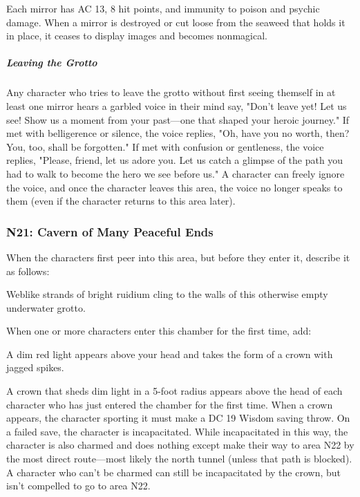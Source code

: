 \documentclass[10pt,a4paper,twoside,bg=print,twocolumn,openany,nodeprecatedcode]{dndbook}
\begin{document}
Each mirror has AC 13, 8 hit points, and immunity to poison and psychic damage. When a mirror is destroyed or cut loose from the seaweed that holds it in place, it ceases to display images and becomes nonmagical.

\subparagraph{Leaving the Grotto}
Any character who tries to leave the grotto without first seeing themself in at least one mirror hears a garbled voice in their mind say, "Don't leave yet! Let us see! Show us a moment from your past—one that shaped your heroic journey." If met with belligerence or silence, the voice replies, "Oh, have you no worth, then? You, too, shall be forgotten." If met with confusion or gentleness, the voice replies, "Please, friend, let us adore you. Let us catch a glimpse of the path you had to walk to become the hero we see before us." A character can freely ignore the voice, and once the character leaves this area, the voice no longer speaks to them (even if the character returns to this area later).

\subsubsection{N21: Cavern of Many Peaceful Ends}
When the characters first peer into this area, but before they enter it, describe it as follows:

\begin{DndReadAloud}{}
Weblike strands of bright ruidium cling to the walls of this otherwise empty underwater grotto.

\end{DndReadAloud}

When one or more characters enter this chamber for the first time, add:

\begin{DndReadAloud}{}
A dim red light appears above your head and takes the form of a crown with jagged spikes.

\end{DndReadAloud}

A crown that sheds dim light in a 5-foot radius appears above the head of each character who has just entered the chamber for the first time. When a crown appears, the character sporting it must make a DC 19 Wisdom saving throw. On a failed save, the character is incapacitated. While incapacitated in this way, the character is also charmed and does nothing except make their way to area N22 by the most direct route—most likely the north tunnel (unless that path is blocked). A character who can't be charmed can still be incapacitated by the crown, but isn't compelled to go to area N22.
\end{document}
